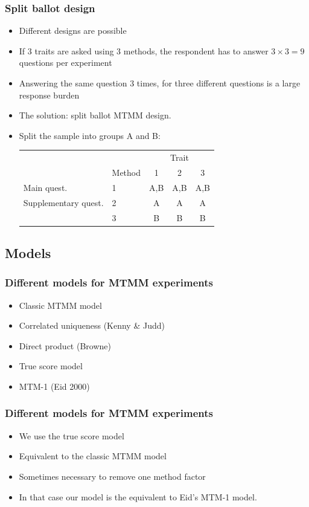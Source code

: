 \documentclass{beamer}
\begin{document}
\begin{frame}	
	\frametitle{Split ballot design}

	\begin{itemize}[<alert@+>]
		\item Different designs are possible
		\item If 3 traits are asked using 3 methods, the respondent has to answer 
			$3 \times 3 = 9$ questions per experiment
		\item Answering the same question 3 times, for three different questions is a large response burden
		\item The solution: split ballot MTMM design.
\item<5-|alert@5> {
	Split the sample into groups A and B:

	\begin{tabular}{llccc}
\hline
		&&\multicolumn{3}{c}{Trait}\\
		& Method & 1 & 2 & 3\\
\hline
		Main quest. 	& 1 & A,B & A,B & A,B\\
		Supplementary quest.	& 2 & A & A & A\\
							& 3 & B & B & B\\
\hline
	\end{tabular}	}
	\end{itemize}

\end{frame}	
\fi

\subsection{Models}

\begin{frame}	
	\frametitle{Different models for MTMM experiments}
	\begin{itemize}[<alert@+>]
		\item Classic MTMM model
		\item Correlated uniqueness (Kenny \& Judd)
		\item Direct product (Browne)
		\item True score model
		\item MTM-1 (Eid 2000)
	\end{itemize}
\end{frame}	
\begin{frame}	
	\frametitle{Different models for MTMM experiments}
	\begin{itemize}[<alert@+>]
		\item We use the true score model
		\item Equivalent to the classic MTMM model
		\item Sometimes necessary to remove one method factor
		\item In that case our model is the equivalent to Eid's MTM-1 model.
	\end{itemize}
\end{frame}	
\end{document}
